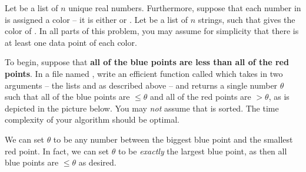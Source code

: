 \begin{progprob}
    Let  be a list of $n$ unique real numbers. Furthermore,
    suppose that each number in  is assigned a color -- it is
    either  or . Let  be a list
    of $n$ strings, such that  gives the color of
    . In all parts of this problem, you may assume for simplicity
    that there is at least one data point of each color.
    
    \begin{subprobset}

        \begin{subprob}
            To begin, suppose that \textbf{all of the blue points are less than all of the red points}.
            In a file named , write an efficient function called
             which takes in two arguments -- the lists 
            and  as described above -- and returns a single number $\theta$
            such that all of the blue points are $\leq
            \theta$ and all of the red points are $> \theta$, as is depicted in
            the picture below. You may \emph{not} assume that  is
            sorted. The time complexity of your algorithm should be optimal.

            \begin{center}
            \end{center}        

            
            \begin{soln}
                We can set $\theta$ to be any number between the biggest blue
                point and the smallest red point. In fact, we can set $\theta$
                to be \emph{exactly} the largest blue point, as then all blue
                points are $\leq \theta$ as desired.


\end{soln}
\end{subprob}
\end{subprobset}
\end{progprob}
